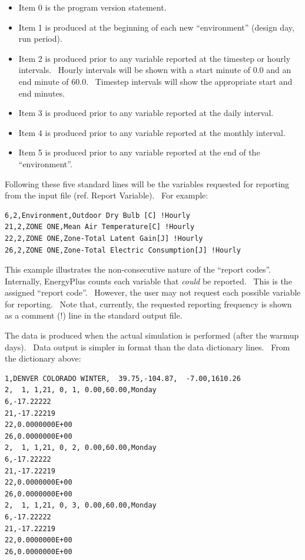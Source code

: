 \begin{itemize}
\item
  Item 0 is the program version statement.
\item
  Item 1 is produced at the beginning of each new ``environment'' (design day, run period).
\item
  Item 2 is produced prior to any variable reported at the timestep or hourly intervals.~ Hourly intervals will be shown with a start minute of 0.0 and an end minute of 60.0.~ Timestep intervals will show the appropriate start and end minutes.
\item
  Item 3 is produced prior to any variable reported at the daily interval.
\item
  Item 4 is produced prior to any variable reported at the monthly interval.
\item
  Item 5 is produced prior to any variable reported at the end of the ``environment''.
\end{itemize}

Following these five standard lines will be the variables requested for reporting from the input file (ref. Report Variable).~ For example:

\begin{lstlisting}
6,2,Environment,Outdoor Dry Bulb [C] !Hourly
21,2,ZONE ONE,Mean Air Temperature[C] !Hourly
22,2,ZONE ONE,Zone-Total Latent Gain[J] !Hourly
26,2,ZONE ONE,Zone-Total Electric Consumption[J] !Hourly
\end{lstlisting}

This example illustrates the non-consecutive nature of the ``report codes''.~ Internally, EnergyPlus counts each variable that \emph{could} be reported.~ This is the assigned ``report code''.~ However, the user may not request each possible variable for reporting.~ Note that, currently, the requested reporting frequency is shown as a comment (!) line in the standard output file.

The data is produced when the actual simulation is performed (after the warmup days).~ Data output is simpler in format than the data dictionary lines.~ From the dictionary above:

\begin{lstlisting}
1,DENVER COLORADO WINTER,  39.75,-104.87,  -7.00,1610.26
2,  1, 1,21, 0, 1, 0.00,60.00,Monday
6,-17.22222
21,-17.22219
22,0.0000000E+00
26,0.0000000E+00
2,  1, 1,21, 0, 2, 0.00,60.00,Monday
6,-17.22222
21,-17.22219
22,0.0000000E+00
26,0.0000000E+00
2,  1, 1,21, 0, 3, 0.00,60.00,Monday
6,-17.22222
21,-17.22219
22,0.0000000E+00
26,0.0000000E+00
\end{lstlisting}

